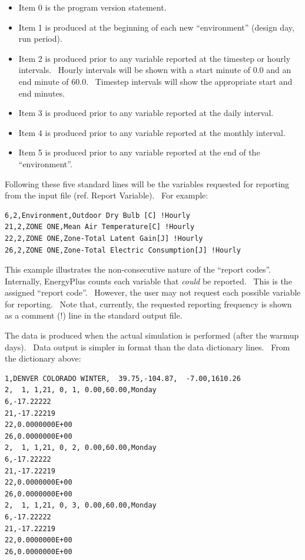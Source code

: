 \begin{itemize}
\item
  Item 0 is the program version statement.
\item
  Item 1 is produced at the beginning of each new ``environment'' (design day, run period).
\item
  Item 2 is produced prior to any variable reported at the timestep or hourly intervals.~ Hourly intervals will be shown with a start minute of 0.0 and an end minute of 60.0.~ Timestep intervals will show the appropriate start and end minutes.
\item
  Item 3 is produced prior to any variable reported at the daily interval.
\item
  Item 4 is produced prior to any variable reported at the monthly interval.
\item
  Item 5 is produced prior to any variable reported at the end of the ``environment''.
\end{itemize}

Following these five standard lines will be the variables requested for reporting from the input file (ref. Report Variable).~ For example:

\begin{lstlisting}
6,2,Environment,Outdoor Dry Bulb [C] !Hourly
21,2,ZONE ONE,Mean Air Temperature[C] !Hourly
22,2,ZONE ONE,Zone-Total Latent Gain[J] !Hourly
26,2,ZONE ONE,Zone-Total Electric Consumption[J] !Hourly
\end{lstlisting}

This example illustrates the non-consecutive nature of the ``report codes''.~ Internally, EnergyPlus counts each variable that \emph{could} be reported.~ This is the assigned ``report code''.~ However, the user may not request each possible variable for reporting.~ Note that, currently, the requested reporting frequency is shown as a comment (!) line in the standard output file.

The data is produced when the actual simulation is performed (after the warmup days).~ Data output is simpler in format than the data dictionary lines.~ From the dictionary above:

\begin{lstlisting}
1,DENVER COLORADO WINTER,  39.75,-104.87,  -7.00,1610.26
2,  1, 1,21, 0, 1, 0.00,60.00,Monday
6,-17.22222
21,-17.22219
22,0.0000000E+00
26,0.0000000E+00
2,  1, 1,21, 0, 2, 0.00,60.00,Monday
6,-17.22222
21,-17.22219
22,0.0000000E+00
26,0.0000000E+00
2,  1, 1,21, 0, 3, 0.00,60.00,Monday
6,-17.22222
21,-17.22219
22,0.0000000E+00
26,0.0000000E+00
\end{lstlisting}

